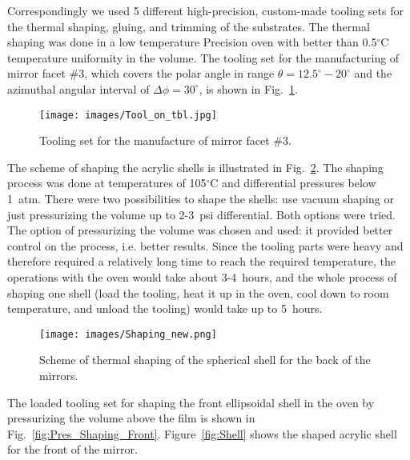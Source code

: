 Correspondingly we used 5 different high-precision, custom-made tooling sets for the thermal shaping, gluing,
and trimming of the substrates. The thermal shaping was done in a low temperature Precision oven with better
than 0.5$^\circ$C  temperature uniformity in the volume. The tooling set for the manufacturing of mirror facet
\#3, which covers the polar angle in range $\theta = 12.5^\circ - 20^\circ$ and the azimuthal angular interval of
$\Delta \phi = 30^\circ$, is shown in Fig.~\ref{fig:Tool_on_tbl}.

\begin{figure}[ht]
    \centering
    \texttt{[image: images/Tool\_on\_tbl.jpg]}
    \caption{Tooling set for the manufacture of mirror facet \#3.}
    \label{fig:Tool_on_tbl}
\end{figure}

The scheme of shaping the acrylic shells is illustrated in  Fig.~\ref{fig:Shaping_new}. The shaping process
was done at temperatures of 105$^\circ$C and differential pressures below 1~atm. There were two
possibilities to shape the shells: use vacuum shaping or just pressurizing the volume up to 2-3~psi differential.
Both options were tried. The option of pressurizing the volume was chosen and used: it provided better control
on the process, i.e. better results. Since the tooling parts were heavy and therefore required a relatively long
time to reach the required temperature, the operations with the oven would take about 3-4~hours, and the whole
process of shaping one shell (load the tooling, heat it up in the oven, cool down to room temperature, and unload
the tooling) would take up to 5~hours.

\begin{figure}[ht]
    \centering
    \texttt{[image: images/Shaping\_new.png]}
    \caption{Scheme of thermal shaping of the spherical shell for the back of the mirrors.}
    \label{fig:Shaping_new}
\end{figure}

The loaded tooling set for shaping the front ellipsoidal shell in the oven by pressurizing the volume above
the film is shown in  Fig.~\ref{fig:Pres_Shaping_Front}. Figure~\ref{fig:Shell} shows the shaped acrylic shell
for the front of the mirror.


